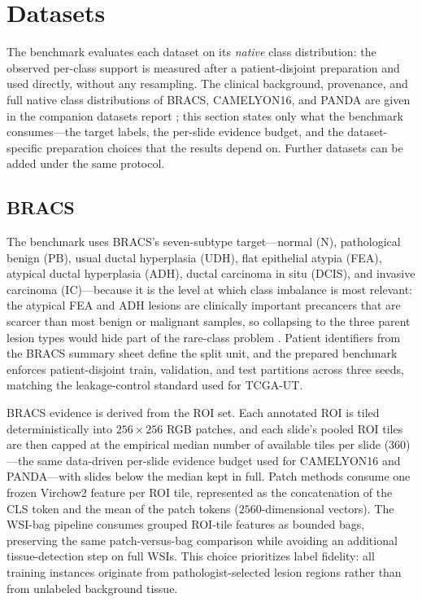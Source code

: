 \documentclass[11pt]{article}
\begin{document}
\section{Datasets}
\label{sec:datasets}
The benchmark evaluates each dataset on its \emph{native} class distribution: the observed per-class support is measured after a patient-disjoint preparation and used directly, without any resampling. The clinical background, provenance, and full native class distributions of BRACS, CAMELYON16, and PANDA are given in the companion datasets report \citep{queisler2026datasets}; this section states only what the benchmark consumes---the target labels, the per-slide evidence budget, and the dataset-specific preparation choices that the results depend on. Further datasets can be added under the same protocol.

\subsection{BRACS}
The benchmark uses BRACS's seven-subtype target---normal (N), pathological benign (PB), usual ductal hyperplasia (UDH), flat epithelial atypia (FEA), atypical ductal hyperplasia (ADH), ductal carcinoma in situ (DCIS), and invasive carcinoma (IC)---because it is the level at which class imbalance is most relevant: the atypical FEA and ADH lesions are clinically important precancers that are scarcer than most benign or malignant samples, so collapsing to the three parent lesion types would hide part of the rare-class problem \citep{brancati2022bracs,queisler2026datasets}. Patient identifiers from the BRACS summary sheet define the split unit, and the prepared benchmark enforces patient-disjoint train, validation, and test partitions across three seeds, matching the leakage-control standard used for TCGA-UT.

BRACS evidence is derived from the ROI set. Each annotated ROI is tiled deterministically into $256\times256$ RGB patches, and each slide's pooled ROI tiles are then capped at the empirical median number of available tiles per slide (\num{360})---the same data-driven per-slide evidence budget used for CAMELYON16 and PANDA---with slides below the median kept in full. Patch methods consume one frozen Virchow2 feature per ROI tile, represented as the concatenation of the CLS token and the mean of the patch tokens ($\num{2560}$-dimensional vectors). The WSI-bag pipeline consumes grouped ROI-tile features as bounded bags, preserving the same patch-versus-bag comparison while avoiding an additional tissue-detection step on full WSIs. This choice prioritizes label fidelity: all training instances originate from pathologist-selected lesion regions rather than from unlabeled background tissue.
\end{document}
